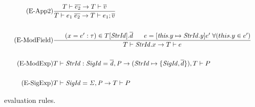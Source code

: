 \begin{figure}[htb]
\begin{align*}
\\
\\
\tag{E-App2}
&\frac{T \vdash \overline{e_{2}} \rightarrow T \vdash \overline{v}}
{T \vdash e_{1}\;\overline{e_{2}} \rightarrow T \vdash e_{1};\overline{v}}
\\
\\
\tag{E-ModField}
&\frac{\;\;\;\;\;\; (x=e':\tau) \in T[\mathit{StrId}].\overline{d} \;\;\;\;\;\; e=[\mathit{this}.y\mapsto \mathit{StrId}.y]e'\;\forall (this.y \in e')}
{T \vdash \mathit{StrId}.x \rightarrow T \vdash e}\\
\\
\tag{E-ModExp}
&T \vdash \mathit{StrId:SigId = \overline{d},P} \rightarrow (\mathit{StrId} \mapsto \lbrace \mathit{SigId},\overline{d}\rbrace), T \vdash P \\
\\
\tag{E-SigExp}
&T \vdash \mathit{SigId = \Sigma, P} \rightarrow T \vdash P
\end{align*}
\caption[\MiniML\ Evaluation Rules]{\MiniML\ evaluation rules.\label{fig:MiniMLOperationalSemantics}}
\end{figure}
